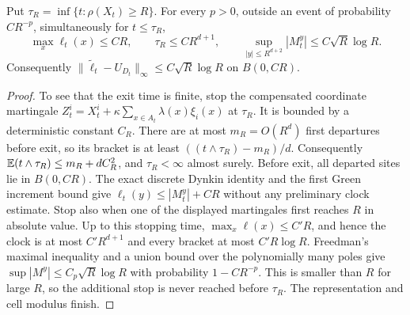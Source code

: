 \begin{lemma}\label{lem:core-bootstrap}
Put $\tau_R=\inf\{t:\rho(X_t)\geq R\}$. For every $p>0$, outside an event
of probability $CR^{-p}$, simultaneously for $t\leq\tau_R$,
\begin{equation}\label{eq:core-bootstrap}
 \max_x\ell_t(x)\leq CR,\qquad
 \tau_R\leq CR^{d+1},\qquad
 \sup_{|y|\leq R^{d+2}}|M_t^y|\leq C\sqrt R\log R.
\end{equation}
Consequently
$\|\widetilde\ell_t-U_{D_t}\|_\infty\leq C\sqrt R\log R$ on
$B(0,CR)$.
\end{lemma}
\begin{proof}
To see that the exit time is finite, stop the compensated coordinate
martingale $Z_t^i=X_t^i+\kappa\sum_{x\in A_t}\lambda(x)\xi_i(x)$
at $\tau_R$. It is bounded by a deterministic constant $C_R$.
There are at most $m_R=O(R^d)$ first departures before exit, so its
bracket is at least $((t\wedge\tau_R)-m_R)/d$. Consequently
$\mathbb E(t\wedge\tau_R)\le m_R+dC_R^2$, and $\tau_R<\infty$ almost surely. Before exit, all departed sites lie in $B(0,CR)$.
The exact discrete Dynkin identity and the first Green increment bound
give $\ell_t(y)\leq |M_t^y|+CR$ without any preliminary clock estimate.
Stop also when one of the displayed martingales first reaches $R$ in
absolute value. Up to this stopping time, $\max_x\ell(x)\leq C'R$,
and hence the clock is at most $C'R^{d+1}$ and every bracket at most
$C'R\log R$. Freedman's maximal inequality \citep[Theorem~1.6]{Freedman1975} and a union bound over the
polynomially many poles give
$\sup|M^y|\leq C_p\sqrt R\log R$ with probability $1-CR^{-p}$.
This is smaller than $R$ for large $R$, so the additional stop is never
reached before $\tau_R$. The representation and cell modulus finish.
\end{proof}

